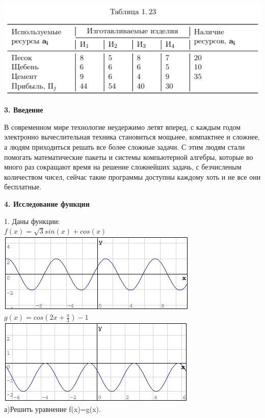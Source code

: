 \documentclass[russian,utf8,nocolumnxxxi,nocolumnxxxii]{eskdtext}
\begin{document}
{\par
\includegraphics[scale=0.75]{2019-01-09_01-47-19}
\newpage
\begin{center} {\bf3. Введение} \end{center}
\par
\normalsize В современном мире технологие неудержимо летят вперед, с каждым годом электронно вычеслительная техника становиться мощьнее, компактнее и сложнее, а людям приходиться решать все более сложные задачи. С этим людям стали помогать математические пакеты и системы компьютерной алгебры, которые во много раз сокращают время на решение сложнейших задачь, с безчисленым количеством чисел, сейчас такие программы доступны каждому хоть и не все они бесплатные.
\newpage
\begin{center}{\bf4. Исследование функции} \end{center}
\par
\normalsize1. Даны функции:
\\$f(x)=\sqrt{3}sin(x)+cos(x)$\\ \includegraphics{f(x)}
\\$g(x)=cos(2x+\frac{\pi}{3})-1$\\\includegraphics{g(x)}
\\а)Решить уравнение f(x)=g(x).
}
\end{document}
